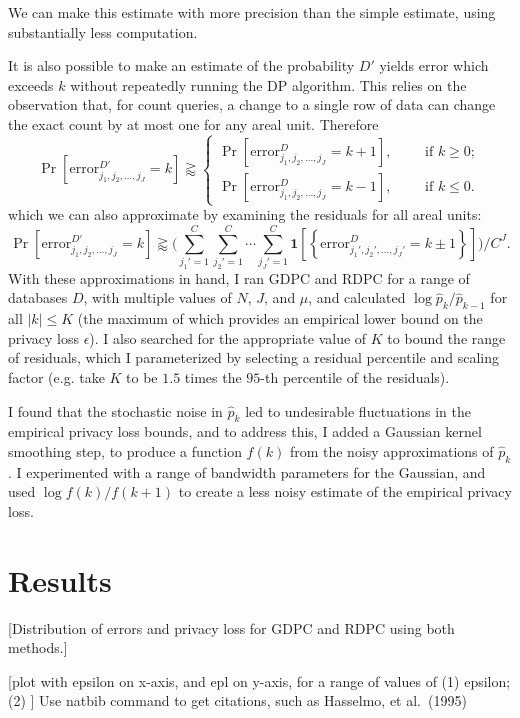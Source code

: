 \documentclass{article}
\begin{document}
We can make this estimate with more precision than the simple estimate, using substantially less computation.

It is also possible to make an estimate of the probability $D'$ yields error which exceeds $k$ without repeatedly running the DP algorithm.  This relies on the observation that, for count queries, a change to a single row of data can change the exact count by at most one for any areal unit.  Therefore
$$
\Pr\left[\mathrm{error}_{j_1, j_2, \ldots, j_{J}}^{D'}
= k\right]
\gtrapprox
\begin{cases}
\Pr\left[\mathrm{error}_{j_1, j_2, \ldots, j_{J}}^{D}
= k+1\right], \qquad \text{ if } k \geq 0;\\[.1in]
\Pr\left[\mathrm{error}_{j_1, j_2, \ldots, j_{J}}^{D}
= k-1\right], \qquad \text{ if } k \leq 0.
\end{cases}
$$
which we can also approximate by examining the residuals for all areal units:
$$\Pr\left[\mathrm{error}_{j_1, j_2, \ldots, j_{J}}^{D'}
= k\right]
\gtrapprox 
\bigg(\sum_{j_1'=1}^C\sum_{j_2'=1}^C\cdots\sum_{j_J' = 1}^C \mathbf{1}\left[\left\{\mathrm{error}_{j_1', j_2', \ldots, j_{J}'}^D
= k\pm 1\right\}\right]\bigg)\bigg/C^J.
$$
With these approximations in hand, I ran GDPC and RDPC for a range of databases $D$, with multiple values of $N$, $J$, and $\mu$, and calculated $\log \hat{p}_k / \hat{p}_{k-1}$ for all $|k| \leq K$ (the maximum of which provides an empirical lower bound on the privacy loss $\epsilon$).  I also searched for the appropriate value of $K$ to bound the range of residuals, which I parameterized by selecting a residual percentile and scaling factor (e.g. take $K$ to be $1.5$ times the $95$-th percentile of the residuals).

I found that the stochastic noise in $\hat{p}_k$ led to undesirable fluctuations in the empirical privacy loss bounds, and to address this, I added a Gaussian kernel smoothing step, to produce a function $f(k)$ from the noisy approximations of $\hat{p}_k$.  I experimented with a range of bandwidth parameters for the Gaussian, and used $\log f(k) / f(k+1)$ to create a less noisy estimate of the empirical privacy loss.

\section{Results}
\label{results}

[Distribution of errors and privacy loss for GDPC and RDPC using both methods.]

[plot with epsilon on x-axis, and epl on y-axis, for a range of values of
(1) epsilon; (2) ]
Use natbib command \citet{hasselmo} to get citations, such as  Hasselmo, et al.\ (1995)
\end{document}
